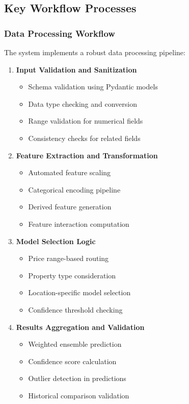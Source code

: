 \documentclass[12pt,a4paper]{report}
\begin{document}
\subsection{Key Workflow Processes}
\subsubsection{Data Processing Workflow}
The system implements a robust data processing pipeline:

\begin{enumerate}
    \item \textbf{Input Validation and Sanitization}
    \begin{itemize}
        \item Schema validation using Pydantic models
        \item Data type checking and conversion
        \item Range validation for numerical fields
        \item Consistency checks for related fields
    \end{itemize}
    
    \item \textbf{Feature Extraction and Transformation}
    \begin{itemize}
        \item Automated feature scaling
        \item Categorical encoding pipeline
        \item Derived feature generation
        \item Feature interaction computation
    \end{itemize}
    
    \item \textbf{Model Selection Logic}
    \begin{itemize}
        \item Price range-based routing
        \item Property type consideration
        \item Location-specific model selection
        \item Confidence threshold checking
    \end{itemize}
    
    \item \textbf{Results Aggregation and Validation}
    \begin{itemize}
        \item Weighted ensemble prediction
        \item Confidence score calculation
        \item Outlier detection in predictions
        \item Historical comparison validation
    \end{itemize}
\end{enumerate}
\end{document}
